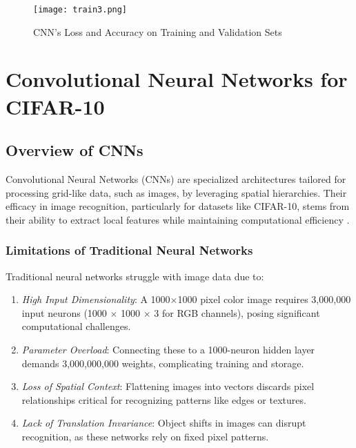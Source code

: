 \documentclass[UTF8]{report}
\theoremstyle{MyLineTheoremStyle} %
\theoremstyle{MyBlockTheoremStyle} %
\theoremstyle{MySubsubsectionStyle} %
\begin{document}
\begin{figure}[H]
    \centering
    \texttt{[image: train3.png]}
    \caption{CNN's Loss and Accuracy on Training and Validation Sets}
    \label{fig:cnn_training_validation_loss_accuracy}
\end{figure}







\cleardoublepage



\section{Convolutional Neural Networks for CIFAR-10}

\subsection{Overview of CNNs}

Convolutional Neural Networks (CNNs) are specialized architectures tailored for processing grid-like data, such as images, by leveraging spatial hierarchies. Their efficacy in image recognition, particularly for datasets like CIFAR-10, stems from their ability to extract local features while maintaining computational efficiency \cite{cifar10}.

\subsubsection{Limitations of Traditional Neural Networks}

Traditional neural networks struggle with image data due to:

\begin{enumerate}[label=\roman*.]
    \item \textit{High Input Dimensionality}: A 1000$\times$1000 pixel color image requires 3,000,000 input neurons (1000 $\times$ 1000 $\times$ 3 for RGB channels), posing significant computational challenges.
    \item \textit{Parameter Overload}: Connecting these to a 1000-neuron hidden layer demands 3,000,000,000 weights, complicating training and storage.
    \item \textit{Loss of Spatial Context}: Flattening images into vectors discards pixel relationships critical for recognizing patterns like edges or textures.
    \item \textit{Lack of Translation Invariance}: Object shifts in images can disrupt recognition, as these networks rely on fixed pixel patterns.
\end{enumerate}
\end{document}
